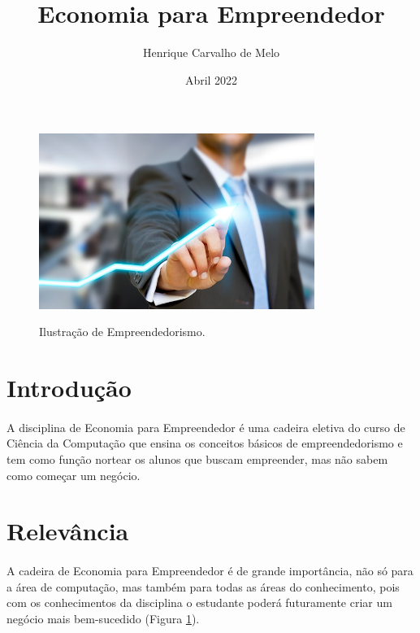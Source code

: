 \documentclass{article}
\title{Economia para Empreendedor}
\author{Henrique Carvalho de Melo}
\date{Abril 2022}
\begin{document}
\maketitle

\begin{figure}[h!]
\centering
\includegraphics[width=0.8\textwidth]{empreendedor.png}
\caption{Ilustração de Empreendedorismo.} \cite{empreendedorismo}
\label{fig:Empreendedorismo}

\end{figure}





\section{Introdução}
\paragraph{}A disciplina de Economia para Empreendedor é uma cadeira eletiva do curso de Ciência da Computação que ensina os conceitos básicos de empreendedorismo e tem como função nortear os alunos que buscam empreender, mas não sabem como começar um negócio.\cite{dornelas2008empreendedorismo}




\section{Relevância}
\paragraph{} A cadeira de Economia para Empreendedor é de grande importância, não só para a área de computação, mas também para todas as áreas do conhecimento, pois com os conhecimentos da disciplina o estudante poderá futuramente criar um negócio mais bem-sucedido (Figura \ref{fig:Empreendedorismo}). \cite{leite2017fenomeno}
\end{document}
